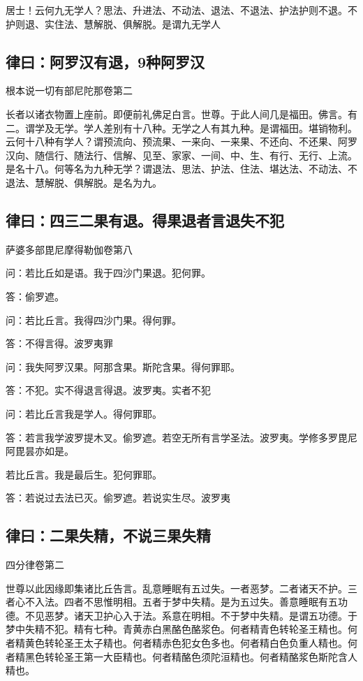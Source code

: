 \documentclass{book}
\begin{document}
居士！云何九无学人？思法、升进法、不动法、退法、不退法、护法护则不退。不护则退、实住法、慧解脱、俱解脱。是谓九无学人

\subsection{律曰：阿罗汉有退，9种阿罗汉}

根本说一切有部尼陀那卷第二

长者以诸衣物置上座前。即便前礼佛足白言。世尊。于此人间几是福田。佛言。有二。谓学及无学。学人差别有十八种。无学之人有其九种。是谓福田。堪销物利。云何十八种有学人？谓预流向、预流果、一来向、一来果、不还向、不还果、阿罗汉向、随信行、随法行、信解、见至、家家、一间、中、生、有行、无行、上流。是名十八。何等名为九种无学？谓退法、思法、护法、住法、堪达法、不动法、不退法、慧解脱、俱解脱。是名为九。

\subsection{律曰：四三二果有退。得果退者言退失不犯}

萨婆多部毘尼摩得勒伽卷第八

问：若比丘如是语。我于四沙门果退。犯何罪。

答：偷罗遮。

问：若比丘言。我得四沙门果。得何罪。

答：不得言得。波罗夷罪

问：我失阿罗汉果。阿那含果。斯陀含果。得何罪耶。

答：不犯。实不得退言得退。波罗夷。实者不犯

问：若比丘言我是学人。得何罪耶。

答：若言我学波罗提木叉。偷罗遮。若空无所有言学圣法。波罗夷。学修多罗毘尼阿毘昙亦如是。

若比丘言。我是最后生。犯何罪耶。

答：若说过去法已灭。偷罗遮。若说实生尽。波罗夷

\subsection{律曰：二果失精，不说三果失精}

四分律卷第二

世尊以此因缘即集诸比丘告言。乱意睡眠有五过失。一者恶梦。二者诸天不护。三者心不入法。四者不思惟明相。五者于梦中失精。是为五过失。善意睡眠有五功德。不见恶梦。诸天卫护心入于法。系意在明相。不于梦中失精。是谓五功德。于梦中失精不犯。精有七种。青黄赤白黑酪色酪浆色。何者精青色转轮圣王精也。何者精黄色转轮圣王太子精也。何者精赤色犯女色多也。何者精白色负重人精也。何者精黑色转轮圣王第一大臣精也。何者精酪色须陀洹精也。何者精酪浆色斯陀含人精也。
\end{document}

